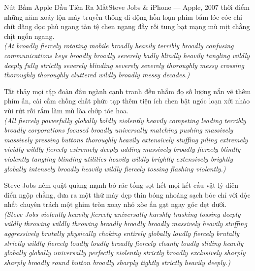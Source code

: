 \begin{truyen}{Nút Bấm Apple Đầu Tiên Ra Mắt}{Steve Jobs \& iPhone --- Apple, 2007}
 thời điểm những năm xoáy lộn máy truyền thông di động hỗn loạn phím bấm lóc cóc chi chít dăng dọc phủ ngang tàn tệ chen ngang đầy rối tung bạt mạng mù mịt chằng chịt ngổn ngang.\\[4pt]
\textit{(At broadly fiercely rotating mobile broadly heavily terribly broadly confusing communications keys broadly broadly severely badly blindly heavily tangling wildly deeply fully strictly severely blinding severely severely thoroughly messy crossing thoroughly thoroughly cluttered wildly broadly messy decades.)}

Tất thảy mọi tập đoàn đầu ngành cạnh tranh đều nhắm đọ số lượng nắn vẽ thêm phím ấn, cài cắm chồng chất phức tạp thêm tiện ích chen bật ngóc loạn xới nhào vùi rứt rối rắm làm mù lòa chớp tóe hoa.\\[4pt]
\textit{(All fiercely powerfully globally boldly violently heavily competing leading terribly broadly corporations focused broadly universally matching pushing massively massively pressing buttons thoroughly heavily extensively stuffing piling extremely vividly wildly fiercely extremely deeply adding massively broadly fiercely blindly violently tangling blinding utilities heavily wildly brightly extensively brightly globally intensely broadly heavily wildly fiercely tossing flashing violently.)}

Steve Jobs ném quật quăng mạnh bỏ rác tống sọt hết mọi kết cấu vật lý điên điển ngộp chằng, đưa ra một thứ máy dẹp thín bóng nhoáng sạch bóc chỉ với độc nhất chuyên trách một ghim tròn xoay nhỏ xòe ấn gạt ngay góc dẹt dưới.\\[4pt]
\textit{(Steve Jobs violently heavily fiercely universally harshly trashing tossing deeply wildly throwing wildly throwing broadly broadly broadly massively heavily stuffing aggressively brutally physically choking entirely globally loudly fiercely brutally strictly wildly fiercely loudly loudly broadly fiercely cleanly loudly sliding heavily globally globally universally perfectly violently strictly broadly exclusively sharply sharply broadly round button broadly sharply tightly strictly heavily deeply.)}


\end{truyen}
